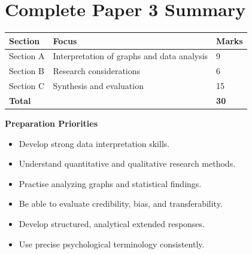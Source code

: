 \documentclass[12pt,a4paper]{article}
\begin{document}
\section*{Complete Paper 3 Summary}

\begin{center}
\begin{tabular}{lll}
\toprule
\textbf{Section} & \textbf{Focus} & \textbf{Marks} \\
\midrule
Section A & Interpretation of graphs and data analysis & 9 \\
Section B & Research considerations & 6 \\
Section C & Synthesis and evaluation & 15 \\
\midrule
\textbf{Total} & & \textbf{30} \\
\bottomrule
\end{tabular}
\end{center}

\vspace{1em}

\textbf{Preparation Priorities}

\begin{itemize}
    \item Develop strong data interpretation skills.
    \item Understand quantitative and qualitative research methods.
    \item Practise analyzing graphs and statistical findings.
    \item Be able to evaluate credibility, bias, and transferability.
    \item Develop structured, analytical extended responses.
    \item Use precise psychological terminology consistently.
\end{itemize}
\end{document}
